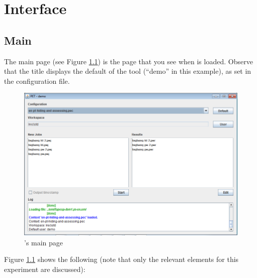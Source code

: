 \chapter{Interface}

\section{Main}

The main page (see Figure \ref{fig:main}) is the page that you see when \PET is loaded. 
Observe that the title displays the default  of the tool (``demo'' in this example), as set in the configuration file.

\begin{figure}[h]\label{fig:main}
\includegraphics[width=1\textwidth]{img/main}
\caption{\PET's main page}
\end{figure}

Figure \ref{fig:main} shows the following (note that only the relevant elements for this experiment are discussed):

